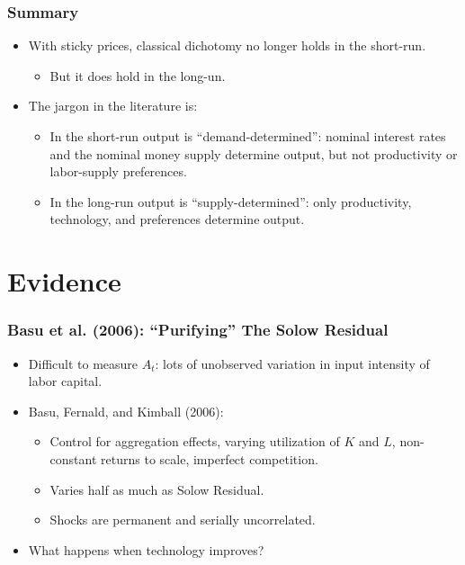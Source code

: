 \documentclass[english,xcolor=svgnames]{beamer}
\begin{document}
\begin{frame}
\frametitle{Summary
}
\begin{itemize}
	\item With sticky prices, classical dichotomy no longer holds in the short-run.
	\begin{itemize}
		\item But it does hold in the long-un.
	\end{itemize}
	\item The jargon in the literature is:
	\begin{itemize}
	\item In the short-run output is ``demand-determined'': nominal interest rates and the nominal money supply determine output, but not productivity or labor-supply preferences.
	\item In the long-run output is ``supply-determined'': only productivity, technology, and preferences determine output.
	\end{itemize}
\end{itemize}

\end{frame}


\section{Evidence}


\begin{frame}
\frametitle{Basu et al. (2006): ``Purifying'' The Solow Residual}
\begin{itemize}
	\item Difficult to measure $A_t$: lots of unobserved variation in input intensity of labor capital.
	\item Basu, Fernald, and Kimball (2006):
	\begin{itemize}
		\item Control for aggregation effects, varying utilization of $K$ and $L$, non-constant returns to scale, imperfect competition.
		\item Varies half as much as Solow Residual.
		\item Shocks are permanent and serially uncorrelated.
	\end{itemize}
	\item What happens when technology improves?
\end{itemize}
\end{frame}
\end{document}
